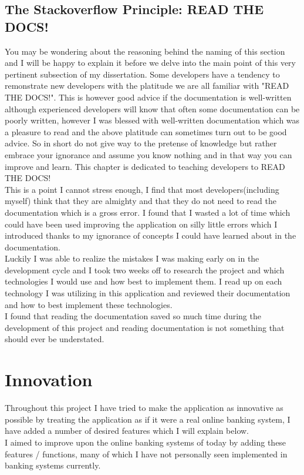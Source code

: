 \subsection{The Stackoverflow Principle: READ THE DOCS!}
You may be wondering about the reasoning behind the naming of this section and I will be happy to explain it before we delve into the main point of this very pertinent subsection of my dissertation.  Some developers have a tendency to remonstrate new developers with the platitude we are all familiar with "READ THE DOCS!".  This is however good advice if the documentation is well-written although experienced developers will know that often some documentation can be poorly written, however I was blessed with well-written documentation which was a pleasure to read and the above platitude can sometimes turn out to be good advice.  So in short do not give way to the pretense of knowledge but rather embrace your ignorance and assume you know nothing and in that way you can improve and learn.  This chapter is dedicated to teaching developers to READ THE DOCS!
\\
This is a point I cannot stress enough,  I find that most developers(including myself) think that they are almighty and that they do not need to read the documentation which is a gross error.  I found that I wasted a lot of time which could have been used improving the application on silly little errors which I introduced thanks to my ignorance of concepts I could have learned about in the documentation.
\\
Luckily I was able to realize the mistakes I was making early on in the development cycle and I took two weeks off to research the project and which technologies I would use and how best to implement them.  I read up on each technology I was utilizing in this application and reviewed their documentation and how to best implement these technologies.
\\
I found that reading the documentation saved so much time during the development of this project and reading documentation is not something that should ever be understated.
\section{Innovation}
Throughout this project I have tried to make the application as innovative as possible by treating the application as if it were a real online banking system, I have added a number of desired features which I will explain below.
\\
I aimed to improve upon the online banking systems of today by adding these features / functions, many of which I have not personally seen implemented in banking systems currently.
